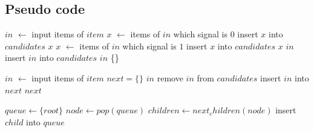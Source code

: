 \documentclass[12pt,a4paper]{article}
\begin{document}
\subsection{Pseudo code}

{\linespread{1}

\begin{algorithm}
\caption{$static\_analysis(candidates, item)$}
\begin{algorithmic}[1]
\STATE $in$ $\leftarrow$ input items of $item$
    \STATE $x$ $\leftarrow$ items of $in$ which signal is $0$
        \STATE insert $x$ into $candidates$
        \RETURN $x$
    \ENDIF
{}
    \STATE $x$ $\leftarrow$ items of $in$ which signal is $1$
        \STATE insert $x$ into $candidates$
        \RETURN $x$
    \ENDIF
{}
    \RETURN $in$
\ELSE
    \STATE insert $in$ into $candidates$
    \RETURN $in$
\ENDIF
\RETURN \{\}
\end{algorithmic}
\end{algorithm}

\begin{algorithm}
\caption{$dynamic\_analysis(candidates, item)$}
\begin{algorithmic}[1]
\STATE $in$ $\leftarrow$ input items of $item$
\STATE $next = \{\}$
    \RETURN $in$
\ENDIF
{}
        \STATE remove $in$ from $candidates$
        \STATE insert $in$ into $next$
    \ENDIF
\ENDFOR
\RETURN $next$
\end{algorithmic}
\end{algorithm}

\begin{algorithm}
\caption{$breadth\_first\_traversal(root, next\_children)$}
\begin{algorithmic}[1]
\STATE $queue \leftarrow \{root\}$
    \STATE $node \leftarrow pop(queue)$
    \STATE $children \leftarrow next_children(node)$
    \STATE insert $child$ into $queue$
\ENDWHILE
\end{algorithmic}
\end{algorithm}

}
\end{document}
